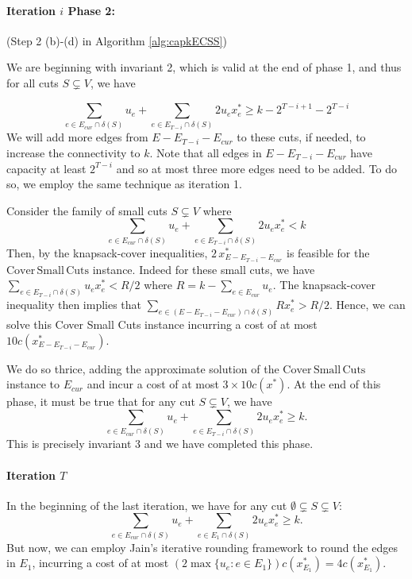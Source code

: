 \documentclass[11pt]{article}
\newcommand\ASC{\mathrm{Cover\,Small\,Cuts}}
\newcommand{\alphatwo}{2}
\begin{document}
{\paragraph{Iteration $i$ Phase 2:} (Step 2 (b)-(d) in Algorithm \ref{alg:capkECSS})

We are beginning with invariant 2, which is valid at the end of phase 1, and thus for all cuts $S \subsetneq V$, we have

\[
    \sum_{e\in E_{cur} \cap \delta(S)}u_e + \sum_{e\in E_{T-i} \cap \delta(S)}\alphatwo u_ex^*_e \geq k-2^{T-i+1} - 2^{T-i}
\]
We will add more edges from $E-E_{T-i}-E_{cur}$ to these cuts, if needed, to
increase the connectivity to $k$. Note that all edges in
$E-E_{T-i}-E_{cur}$ have capacity at least $2^{T-i}$ and so at most three more edges need to be added. To do so, we employ the same
technique as iteration 1.

Consider the family of small cuts $S \subsetneq V$ where
\[
\sum_{e\in E_{cur} \cap \delta(S)} u_e + \sum_{e\in E_{T-i} \cap \delta(S)}\alphatwo u_e x^*_e <k
\]
Then, by the knapsack-cover inequalities,
$\alphatwo\,x^*_{E-E_{T-i}-E_{cur}}$ is feasible for
the $\ASC$ instance. Indeed for these small cuts, we have $\sum_{e\in
E_{T-i} \cap \delta(S)}u_ex^*_e < R/\alphatwo$ where $R = k - \sum_{e\in E_{cur}}u_e$.
The knapsack-cover inequality then implies that $\sum_{e\in (E-E_{T-i} - E_{cur}) \cap \delta(S)}
R x^*_e > R/\alphatwo$. Hence, we can solve this Cover Small Cuts instance incurring a cost of at most $10c(x^*_{E-E_{T-i}-E_{cur}})$.

We do so thrice, adding the approximate solution
of the $\ASC$ instance to $E_{cur}$ and incur a cost of at most
$3\times 10c(x^*)$. At the end of this phase, it must be true that for any cut $S \subsetneq V$, we have
\[
\sum_{e\in E_{cur} \cap \delta(S)}u_e + \sum_{e\in E_{T-i} \cap \delta(S)}\alphatwo u_e x^*_e \geq k.
\]
This is precisely invariant 3 and we have completed this phase.

\paragraph{Iteration $T$}

In the beginning of the last iteration, we have for any cut $\emptyset \subsetneq S \subsetneq V$:
\[
\sum_{e\in E_{cur} \cap \delta(S)}u_e + \sum_{e\in E_{1} \cap \delta(S)}\alphatwo u_e x^*_e \geq k.
\]
But now, we can employ Jain's iterative rounding framework to round
the edges in $E_1$, incurring a cost of at most
$(2\max\{u_e: e\in E_1\})c(x^*_{E_1}) = 4c(x^*_{E_1})$.


}
\end{document}
